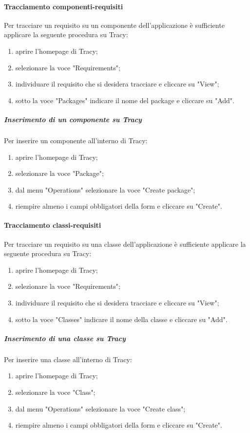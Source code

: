 \documentclass[../NormeProgetto.tex]{subfiles}
\begin{document}
			\paragraph{Tracciamento componenti-requisiti}
				Per tracciare un requisito su un componente dell'applicazione è sufficiente applicare la seguente procedura su Tracy:
				\begin{enumerate}
					\item aprire l'homepage di Tracy;
					\item selezionare la voce "Requirements";
					\item individuare il requisito che si desidera tracciare e cliccare su "View";
					\item sotto la voce "Packages" indicare il nome del package e cliccare su "Add".
				\end{enumerate}
				
				\subparagraph{Inserimento di un componente su Tracy}
					Per inserire un componente all'interno di Tracy:
					\begin{enumerate}
						\item aprire l'homepage di Tracy;
						\item selezionare la voce "Package";
						\item dal menu "Operations" selezionare la voce "Create package";
						\item riempire almeno i campi obbligatori della form e cliccare su "Create".
					\end{enumerate}
			\paragraph{Tracciamento classi-requisiti}
				Per tracciare un requisito su una classe dell'applicazione è sufficiente applicare la seguente procedura su Tracy:
				\begin{enumerate}
					\item aprire l'homepage di Tracy;
					\item selezionare la voce "Requirements";
					\item individuare il requisito che si desidera tracciare e cliccare su "View";
					\item sotto la voce "Classes" indicare il nome della classe e cliccare su "Add".
				\end{enumerate}
				\subparagraph{Inserimento di una classe su Tracy}
					Per inserire una classe all'interno di Tracy:
					\begin{enumerate}
						\item aprire l'homepage di Tracy;
						\item selezionare la voce "Class";
						\item dal menu "Operations" selezionare la voce "Create class";
						\item riempire almeno i campi obbligatori della form e cliccare su "Create".
					\end{enumerate}
\end{document}
